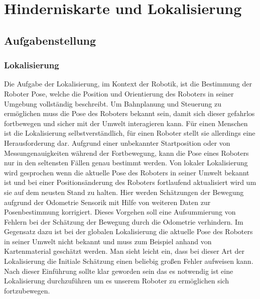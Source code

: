 \chapter{Hinderniskarte und Lokalisierung}
\label{lokalisierung_cha}
\section{Aufgabenstellung}
\label{lokalisierung_aufgabenstellung_sec}
\authorsection{\editorandreas}
\subsection{Lokalisierung}
Die Aufgabe der Lokalisierung, im Kontext der Robotik, ist die Bestimmung der
Roboter Pose, welche die Position und Orientierung des Roboters in seiner Umgebung vollständig beschreibt.
 Um Bahnplanung und Steuerung zu ermöglichen muss die Pose des Roboters bekannt sein,
 damit sich dieser gefahrlos fortbewegen und sicher mit der Umwelt interagieren kann.
 Für einen Menschen ist die Lokalisierung selbstverständlich, für einen Roboter
 stellt sie allerdings eine Herausforderung dar.
 Aufgrund einer unbekannter Startposition oder von Messungenauigkeiten während
 der Fortbewegung, kann die Pose eines Roboters nur in den seltensten Fällen
 genau bestimmt werden.
  Von lokaler Lokalisierung wird gesprochen wenn die aktuelle Pose des Roboters
 in seiner Umwelt bekannt ist und bei einer Positionsänderung des Roboters
 fortlaufend aktualisiert wird um sie auf dem neusten Stand zu halten. Hier
 werden Schätzungen der Bewegung aufgrund der Odometrie Sensorik mit Hilfe von weiteren Daten zur Posenbestimmung korrigiert. Dieses Vorgehen soll eine Aufsummierung von Fehlern bei der
 Schätzung der Bewegung durch die Odometrie verhindern. Im Gegensatz dazu ist
 bei der globalen Lokalisierung die aktuelle Pose des Roboters in seiner Umwelt
 nicht bekannt und muss zum Beispiel anhand von Kartenmaterial geschätzt werden.
 Man sieht leicht ein, dass bei dieser Art der Lokalisierung die Initiale
 Schätzung einen beliebig großen Fehler aufweisen kann.
 Nach dieser Einführung sollte klar geworden sein das es notwendig
 ist eine Lokalisierung durchzuführen um es unserem Roboter zu
 ermöglichen sich fortzubewegen.
